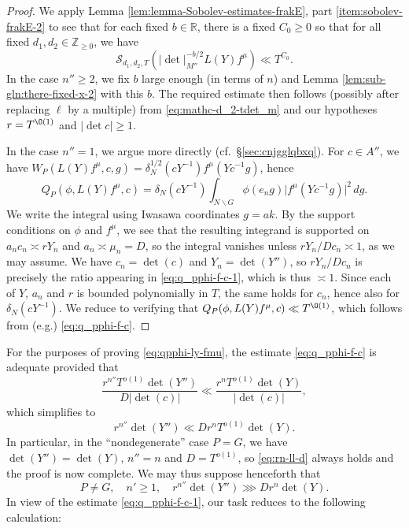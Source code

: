 \begin{proof}
  We apply Lemma \ref{lem:lemma-Sobolev-estimates-frakE}, part \eqref{item:sobolev-frakE-2} to see that for each fixed $b \in \mathbb{R}$, there is a fixed $C_0 \geq 0$ so that for all fixed $d_1,d_2 \in \mathbb{Z}_{\geq 0}$, we have
  \begin{equation}\label{eq:mathc-d_2-tdet_m}
    \mathcal{S}_{d_1, d_2, T}(|\det|_{M''}^{-b/2} L(Y) f^{\mu}) \ll T^{C_0}.
  \end{equation}
  In the case $n'' \geq 2$, we fix $b$ large enough (in terms of $n$) and Lemma \ref{lem:sub-gln:there-fixed-x-2} with this $b$.  The required estimate then follows (possibly after replacing $\ell$ by a multiple) from \eqref{eq:mathc-d_2-tdet_m} and our hypotheses $r = T^{\O(1)}$ and $|\det c| \geq 1$.

  In the case $n'' = 1$, we argue more directly (cf.\ \S\ref{sec:cnjgglqbxq}).  For $c \in A''$, we have $W_P(L(Y) f^\mu, c, g) = \delta_N^{1/2}(c Y^{-1}) f^\mu(Y c^{-1} g)$, hence
  \begin{equation}\label{eq:cnjfy7zeut}
    Q_P(\phi, L(Y) f^\mu, c) =
    \delta_N(c Y^{-1}) \int_{N \backslash G} \phi(e_n g) \lvert f^\mu(Y c^{-1} g) \rvert^2 \, d g.
  \end{equation}
  We write the integral using Iwasawa coordinates $g = a k$.  By the support conditions on $\phi$ and $f^\mu$, we see that the resulting integrand is supported on $a_n c_n \asymp r Y_n$ and $a_n \asymp \mu_n = D$, so the integral vanishes unless $r Y_n / D c_n \asymp 1$, as we may assume.  We have $c_n = \det (c)$ and $Y_n = \det(Y'')$, so $r Y_n / D c_n$ is precisely the ratio appearing in \eqref{eq:q_pphi-f-c-1}, which is thus $\asymp 1$.  Since each of $Y$, $a_n$ and $r$ is bounded polynomially in $T$, the same holds for $c_n$, hence also for $\delta_N(c Y^{-1})$.  We reduce to verifying that $Q_P(\phi, L(Y) f^\mu , c) \ll T^{\O(1)}$, which follows from (e.g.) \eqref{eq:q_pphi-f-c}.
\end{proof}

For the purposes of proving \eqref{eq:qpphi-ly-fmu}, the estimate \eqref{eq:q_pphi-f-c} is adequate provided that
\begin{equation*}
  \frac{r^{n''} T^{o(1)}  \det (Y'') }{D |\det (c)| } \ll \frac{r^n T^{o(1)} \det(Y)}{|\det (c)|},
\end{equation*}
which simplifies to
\begin{equation}\label{eq:rn-ll-d}
  r^{n''}\det(Y'') \ll D r^n T^{o(1)} \det(Y).
\end{equation}
In particular, in the ``nondegenerate'' case $P = G$, we have $\det(Y'') = \det(Y)$, $n'' = n$ and $D = T^{o(1)}$, so \eqref{eq:rn-ll-d} always holds and the proof is now complete.  We may thus suppose henceforth that
\begin{equation}\label{eq:p-neq-g}
  P \neq G,
  \quad
  n' \geq 1,
  \quad
  r^{n''} \det(Y'') \ggg D r^n \det(Y).
\end{equation}
In view of the estimate \eqref{eq:q_pphi-f-c-1}, our task reduces to the following calculation:

